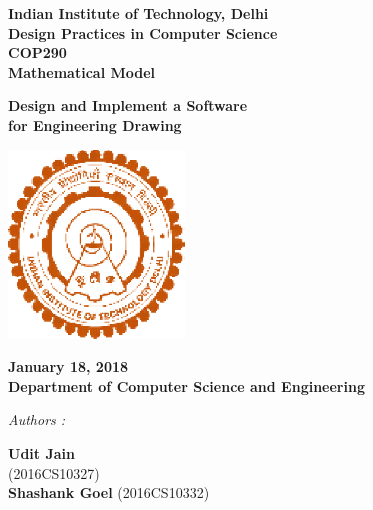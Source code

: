 \documentclass[12pt]{report}
\begin{document}
\begin{center}
\LARGE{\textbf{Indian Institute of Technology, Delhi}}\\
\vspace{1cm}
\large{\textbf{Design Practices in Computer Science}}\\[5pt]
\large{\textbf{COP290}}\\[5pt]
\large{\textbf{Mathematical Model}}\\[5pt]
\vspace{0.5cm}

\large{\textbf{Design and Implement a Software }}
\large{\textbf{\\for Engineering Drawing}}\\[5pt]



\begin{center}
\includegraphics[height=5cm]{iitd.eps}
\end{center}
\vspace{0.2cm}

\textbf{January 18, 2018} \\
\textbf{Department of Computer Science and Engineering} \\


\vspace{2cm}


\begin{multicols*}{2}

\begin{flushleft}

\textit{Authors :\\ }


\textbf{Udit Jain} \\
(2016CS10327)\\
\textbf{Shashank Goel}
(2016CS10332)\\


\end{flushleft}
\end{multicols*}
\end{center}
\end{document}
